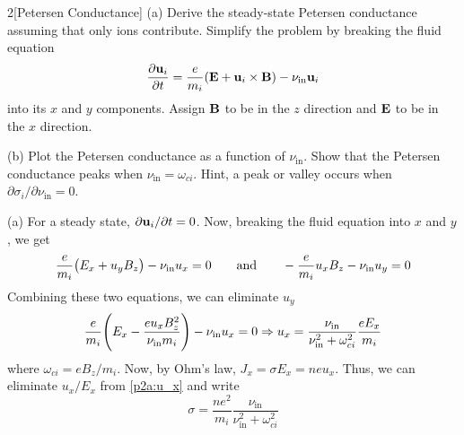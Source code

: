 \documentclass[12pt]{article}
\begin{document}
\begin{problem}{2}[Petersen Conductance]
(a) Derive the steady-state Petersen conductance assuming that only ions
contribute. Simplify the problem by breaking the fluid equation
\begin{equation}
    \frac{\partial\vb{u}_i}{\partial
    t}=\frac{e}{m_i}\qty(\vb{E}+\vb{u}_i\times\vb{B})-\nu_\text{in}\vb{u}_i 
\end{equation}
into its $x$ and $y$ components. Assign $\vb{B}$ to be in the $z$ direction and
$\vb{E}$ to be in the $x$ direction.

(b) Plot the Petersen conductance as a function of $\nu_\text{in}$. Show that
the Petersen conductance peaks when $\nu_\text{in}=\omega_{ci}$. Hint, a peak or
valley occurs when $\partial\sigma_i/\partial\nu_\text{in}=0$.
\begin{solution}
    (a) For a steady state, $\partial\vb{u}_i/\partial t=0$. Now, breaking the 
    fluid equation into $x$ and $y$, we get
\begin{equation}
    \frac{e}{m_i}\qty(E_x+u_yB_z)-\nu_\text{in}u_x=0
    \qquad\text{and}\qquad
    -\frac{e}{m_i}u_xB_z-\nu_\text{in}u_y=0
\end{equation}
Combining these two equations, we can eliminate $u_y$
\begin{equation}\label{p2a:u_x}
    \frac{e}{m_i}\qty(E_x-\frac{eu_xB_z^2}{\nu_\text{in}m_i})-\nu_\text{in}u_x=0
    \Rightarrow
    u_x=\frac{\nu_\text{in}}{\nu_\text{in}^2+\omega_{ci}^2}\frac{eE_x}{m_i}
\end{equation}
where $\omega_{ci}=eB_z/m_i$. Now, by Ohm's law, $J_x=\sigma E_x=neu_x$. Thus, 
we can eliminate $u_x/E_x$ from \eqref{p2a:u_x} and write
\begin{equation}
    \sigma=\frac{ne^2}{m_i}\frac{\nu_\text{in}}{\nu_\text{in}^2+\omega_{ci}^2}
\end{equation}


\end{solution}
\end{problem}
\end{document}
